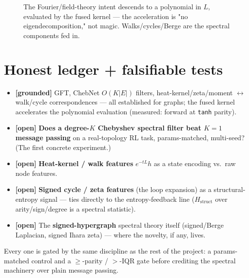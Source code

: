 \documentclass[11pt]{article}
\newcommand{\code}[1]{\texttt{\small #1}}
\newcommand{\grd}{\textcolor{green!50!black}{\textbf{[grounded]}}}
\newcommand{\opn}{\textcolor{orange!80!black}{\textbf{[open]}}}
\begin{document}
\begin{figure}[h]\centering
{}
\caption{The Fourier/field-theory intent descends to a polynomial in $L$, evaluated by the fused kernel ---
the acceleration is "no eigendecomposition," not magic. Walks/cycles/Berge are the spectral components fed in.}
\end{figure}

\section{Honest ledger + falsifiable tests}
\begin{itemize}[nosep]
  \item \grd{} GFT, ChebNet $O(K|E|)$ filters, heat-kernel/zeta/moment $\leftrightarrow$ walk/cycle
        correspondences --- all established for graphs; the fused kernel accelerates the polynomial evaluation
        (measured: forward at \code{tanh} parity).
  \item \opn{} \textbf{Does a degree-$K$ Chebyshev spectral filter beat $K{=}1$ message passing} on a
        real-topology RL task, params-matched, multi-seed? (The first concrete experiment.)
  \item \opn{} \textbf{Heat-kernel / walk features} $e^{-tL}h$ as a state encoding vs.\ raw node features.
  \item \opn{} \textbf{Signed cycle / zeta features} (the loop expansion) as a structural-entropy signal ---
        ties directly to the entropy-feedback line ($H_{\text{struct}}$ over arity/sign/degree is a spectral
        statistic).
  \item \opn{} The \textbf{signed-hypergraph} spectral theory itself (signed/Berge Laplacian, signed Ihara
        zeta) --- where the novelty, if any, lives.
\end{itemize}
Every one is gated by the same discipline as the rest of the project: a params-matched control and a
$\ge$-parity / $>$-IQR gate before crediting the spectral machinery over plain message passing.
\end{document}
